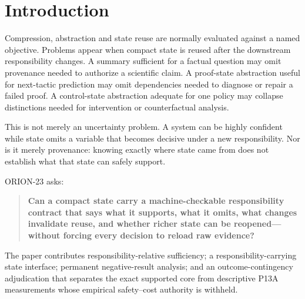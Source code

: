 \section{Introduction}\label{introduction}

Compression, abstraction and state reuse are normally evaluated against
a named objective. Problems appear when compact state is reused after
the downstream responsibility changes. A summary sufficient for a
factual question may omit provenance needed to authorize a scientific
claim. A proof-state abstraction useful for next-tactic prediction may
omit dependencies needed to diagnose or repair a failed proof. A
control-state abstraction adequate for one policy may collapse
distinctions needed for intervention or counterfactual analysis.

This is not merely an uncertainty problem. A system can be highly
confident while state omits a variable that becomes decisive under a new
responsibility. Nor is it merely provenance: knowing exactly where state
came from does not establish what that state can safely support.

ORION-23 asks:

\begin{quote}
\textbf{Can a compact state carry a machine-checkable responsibility
contract that says what it supports, what it omits, what changes
invalidate reuse, and whether richer state can be reopened---without
forcing every decision to reload raw evidence?}
\end{quote}

The paper contributes responsibility-relative sufficiency; a
responsibility-carrying state interface; permanent negative-result
analysis; and an outcome-contingency adjudication that separates the
exact supported core from descriptive P13A measurements whose empirical
safety--cost authority is withheld.
